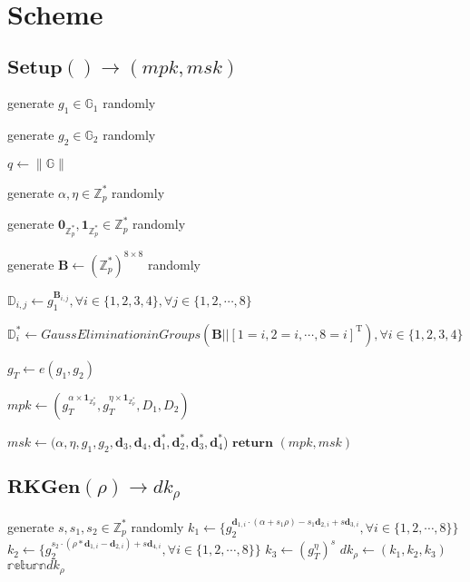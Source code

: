 \documentclass[a4paper]{article}
\begin{document}
\section{Scheme}

\subsection{$\textbf{Setup}() \rightarrow (\textit{mpk}, \textit{msk})$}

generate $g_1 \in \mathbb{G}_1$ randomly

generate $g_2 \in \mathbb{G}_2$ randomly

$q \gets \|\mathbb{G}\|$

generate $\alpha, \eta \in \mathbb{Z}_p^*$ randomly

generate $\mathbf{0}_{\mathbb{Z}_p^*}, \mathbf{1}_{\mathbb{Z}_p^*} \in \mathbb{Z}_p^*$ randomly

generate $\bm{B} \gets (\mathbb{Z}_p^*)^{8 \times 8}$ randomly

$\mathbb{D}_{i, j} \gets g_1^{\bm{B}_{i, j}}, \forall i \in \{1, 2, 3, 4\}, \forall j \in \{1, 2, \cdots, 8\}$

$\mathbb{D}_i^* \gets \textit{GaussEliminationinGroups}(\bm{B} || [1 = i, 2 = i, \cdots, 8 = i]^\mathrm{T}), \forall i \in \{1, 2, 3, 4\}$

$g_T \gets e(g_1, g_2)$

$\textit{mpk} \gets (g_T^{\alpha \times \mathbf{1}_{\mathbb{Z}_p^*}}, g_T^{\eta \times \mathbf{1}_{\mathbb{Z}_p^*}}, D_1, D_2)$

$\textit{msk} \gets (\alpha, \eta, g_1, g_2, \bm{d}_3, \bm{d}_4, \bm{d}_1^*, \bm{d}_2^*, \bm{d}_3^*, \bm{d}_4^*$)
$\textbf{return }(\textit{mpk}, \textit{msk})$
\subsection{$\textbf{RKGen}(\rho) \rightarrow \textit{dk}_\rho$}

generate $s, s_1, s_2 \in \mathbb{Z}_p^*$ randomly
$k_1 \gets \{g_2^{\bm{d}_{1, i} \cdot (\alpha + s_1 \rho) - s_1 \bm{d}_{2, i} + s \bm{d}_{3, i}}, \forall i \in \{1, 2, \cdots, 8\}\}$
$k_2 \gets \{g_2^{s_2 \cdot (\rho * \bm{d}_{1, i} - \bm{d}_{2, i}) + s \bm{d}_{4, i}}, \forall i \in \{1, 2, \cdots, 8\}\}$
$k_3 \gets (g_T^\eta)^s$
$\textit{dk}_\rho \gets (k_1, k_2, k_3)$
$\mathbb{return }\textit{dk}_\rho$
\end{document}

